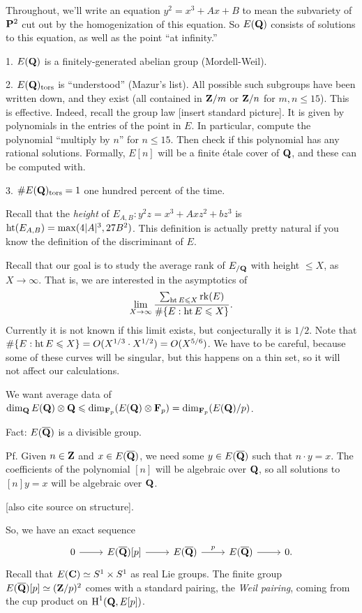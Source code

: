 Throughout, we'll write an equation $y^2=x^3+A x+B$ to mean the subvariety of 
$\mathbf{P}^2$ cut out by the homogenization of this equation. So $E(\mathbf{Q})$ consists 
of solutions to this equation, as well as the point ``at infinity.'' 

1. $E(\mathbf{Q})$ is a finitely-generated abelian group (Mordell-Weil). 

2. $E(\mathbf{Q})_\mathrm{tors}$ is ``understood'' (Mazur's list). All possible such 
subgroups have been written down, and they exist (all contained in 
$\mathbf{Z}/m$ or $\mathbf{Z}/n$ for $m,n\leqslant 15$). This is effective. Indeed, recall 
the group law [insert standard picture]. It is given by polynomials in the 
entries of the point in $E$. In particular, compute the polynomial 
``multiply by $n$'' for $n\leqslant 15$. Then check if this polynomial has 
any rational solutions. Formally, $E[n]$ will be a finite \'etale cover of 
$\mathbf{Q}$, and these can be computed with. 

3. $\#E(\mathbf{Q})_\mathrm{tors}=1$ one hundred percent of the time. 

Recall that the \emph{height} of $E_{A,B}:y^2 z=x^3+A x z^2+b z^3$ is 
$\operatorname{ht}(E_{A,B})=\max(4|A|^3,27 B^2)$. This definition is actually 
pretty natural if you know the definition of the discriminant of $E$. 

Recall that our goal is to study the average rank of $E_{/\mathbf{Q}}$ with height 
$\leqslant X$, as $X\to \infty$. That is, we are interested in the asymptotics 
of 
\[
  \lim_{X\to \infty} \frac{\sum_{\operatorname{ht} E\leqslant X} \operatorname{rk}(E)}{\#\{E:\operatorname{ht} E\leqslant X\}} .
\]
Currently it is not known if this limit exists, but conjecturally it is $1/2$. 
Note that $\#\{E:\operatorname{ht} E\leqslant X\}=O(X^{1/3}\cdot X^{1/2})=O(X^{5/6})$. We 
have to be careful, because some of these curves will be singular, but this happens 
on a thin set, so it will not affect our calculations. 

We want average data of $\dim_{\mathbf{Q}} E(\mathbf{Q})\otimes\mathbf{Q}\leqslant \dim_{\mathbf{F}_p} (E(\mathbf{Q})\otimes \mathbf{F}_p) = \dim_{\mathbf{F}_p}(E(\mathbf{Q})/p)$. 

Fact: $E(\overline{\mathbf{Q}})$ is a divisible group.

Pf. Given $n\in \mathbf{Z}$ and $x\in E(\overline{\mathbf{Q}})$, we need some $y\in E(\overline{\mathbf{Q}})$ 
such that $n\cdot y=x$. The coefficients of the polynomial $[n]$ will be 
algebraic over $\mathbf{Q}$, so all solutions to $[n] y=x$ will be algebraic over $\mathbf{Q}$. 

[also cite source on structure].

So, we have an exact sequence 
\[\begin{tikzcd}
  0 \ar[r] 
    & E(\overline\dQ)[p] \ar[r] 
    & E(\overline\dQ) \ar[r, "p"] 
    & E(\overline\dQ) \ar[r] 
    & 0 .
\end{tikzcd}\]
Recall that $E(\mathbf{C})\simeq S^1\times S^1$ as real Lie groups. The finite group 
$E(\overline{\mathbf{Q}})[p]\simeq (\mathbf{Z}/p)^2$ comes with a standard pairing, the 
\emph{Weil pairing}, coming from the cup product on $\operatorname{H}^1(\mathbf{Q},E[p])$. 

